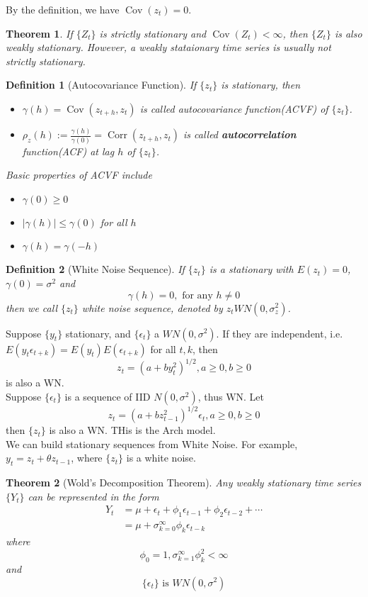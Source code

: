 \documentclass[11pt]{article}
\newtheorem{definition}{Definition}[section]
\newtheorem{theorem}{Theorem}[section]
\theoremstyle{definition}
\DeclareMathOperator{\cov}{Cov}
\DeclareMathOperator{\Corr}{Corr}
\begin{document}
By the definition, we have $\cov(z_t)=0$.
\begin{theorem}\normalfont If $\{Z_t\}$ is strictly stationary and $\cov(Z_t)<\infty$, then $\{Z_t\}$ is also weakly stationary. However, a weakly stataionary time series is usually not strictly stationary.
\end{theorem}
\begin{definition}[Autocovariance Function]
\normalfont If $\{z_t\}$ is stationary, then
\begin{itemize}
\item $\gamma(h)=\cov(z_{t+h}, z_t)$ is called autocovariance function(ACVF) of $\{z_t\}$.
\item $\rho_z(h):=\frac{\gamma(h)}{\gamma(0)}=\Corr(z_{t+h}, z_t)$ is called \textbf{autocorrelation} function(ACF) at lag $h$ of $\{z_t\}$.
\end{itemize}
Basic properties of ACVF include
\begin{itemize}
  \item $\gamma(0)\geq0$
  \item $|\gamma(h)|\leq \gamma(0)$ for all $h$
  \item $\gamma(h)=\gamma(-h)$
\end{itemize}
\end{definition}
\begin{definition}[White Noise Sequence]
\normalfont If $\{z_t\}$ is a stationary with $E(z_t)=0$, $\gamma(0)=\sigma^2$ and
\[
\gamma(h) = 0, \text{ for any }h\neq 0
\]
then we call $\{z_t\}$ white noise sequence, denoted by $z_t WN(0,\sigma_z^2)$.
\end{definition}
Suppose $\{y_t\}$ stationary, and $\{\epsilon_t\}$ a $WN(0, \sigma^2)$. If they are independent, i.e. $E(y_t\epsilon_{t+k})=E(y_t)E(\epsilon_{t+k})$ for all $t, k$, then
\[
z_t=(a+by_t^2)^{1/2}, a\geq 0, b\geq 0
\]
is also a WN.\\
Suppose $\{\epsilon_t\}$ is a sequence of IID $N(0,\sigma^2)$, thus WN. Let
\[
z_t=(a+bz_{t-1}^2)^{1/2}\epsilon_t, a\geq 0, b\geq 0
\]
then $\{z_t\}$ is also a WN. THis is the Arch model.\\
We can build stationary sequences from White Noise. For example, $y_t = z_t+\theta z_{t-1}$, where $\{z_t\}$ is a white noise.
\begin{theorem}[Wold's Decomposition Theorem]
\normalfont Any weakly stationary time series $\{Y_t\}$ can be represented in the form
\begin{align*}
Y_t &= \mu + \epsilon_t + \phi_1\epsilon_{t-1} + \phi_2\epsilon_{t-2} + \cdots\\
    &=\mu + \sigma_{k=0}^\infty \phi_k\epsilon_{t-k}
\end{align*}
where
\[
\phi_0 = 1, \sigma_{k=1}^\infty \phi_{k}^2 <\infty
\]
and
\[
\{\epsilon_t\}\text{ is }WN(0, \sigma^2)
\]
\end{theorem}
\end{document}
